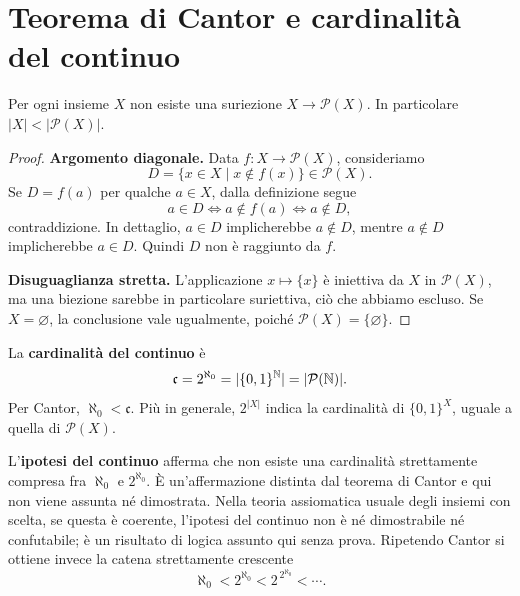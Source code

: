\section{Teorema di Cantor e cardinalità del continuo}
\begin{teorema}[Cantor]\label{teo:cantor}
Per ogni insieme $X$ non esiste una suriezione $X\to\mathcal P(X)$. In particolare $|X|<|\mathcal P(X)|$.
\end{teorema}
\begin{proof}
\textbf{Argomento diagonale.} Data $f:X\to\mathcal P(X)$, consideriamo
\[
D=\{x\in X\mid x\notin f(x)\}\in\mathcal P(X).
\]
Se $D=f(a)$ per qualche $a\in X$, dalla definizione segue
\[
a\in D\iff a\notin f(a)\iff a\notin D,
\]
contraddizione. In dettaglio, $a\in D$ implicherebbe $a\notin D$, mentre $a\notin D$ implicherebbe $a\in D$. Quindi $D$ non è raggiunto da $f$.

\textbf{Disuguaglianza stretta.} L'applicazione $x\mapsto\{x\}$ è iniettiva da $X$ in $\mathcal P(X)$, ma una biezione sarebbe in particolare suriettiva, ciò che abbiamo escluso. Se $X=\varnothing$, la conclusione vale ugualmente, poiché $\mathcal P(X)=\{\varnothing\}$.
\end{proof}

\begin{definizione}
La \textbf{cardinalità del continuo} è
\[
\mathfrak c=2^{\aleph_0}=|\{0,1\}^{\mathbb{N}}|=|\mathcal P(\mathbb{N})|.
\]
Per Cantor, $\aleph_0<\mathfrak c$. Più in generale, $2^{|X|}$ indica la cardinalità di $\{0,1\}^X$, uguale a quella di $\mathcal P(X)$.
\end{definizione}

\begin{osservazione}
L'\textbf{ipotesi del continuo} afferma che non esiste una cardinalità strettamente compresa fra $\aleph_0$ e $2^{\aleph_0}$. È un'affermazione distinta dal teorema di Cantor e qui non viene assunta né dimostrata. Nella teoria assiomatica usuale degli insiemi con scelta, se questa è coerente, l'ipotesi del continuo non è né dimostrabile né confutabile; è un risultato di logica assunto qui senza prova. Ripetendo Cantor si ottiene invece la catena strettamente crescente
\[
\aleph_0<2^{\aleph_0}<2^{\,2^{\aleph_0}}<\cdots.
\]
\end{osservazione}



